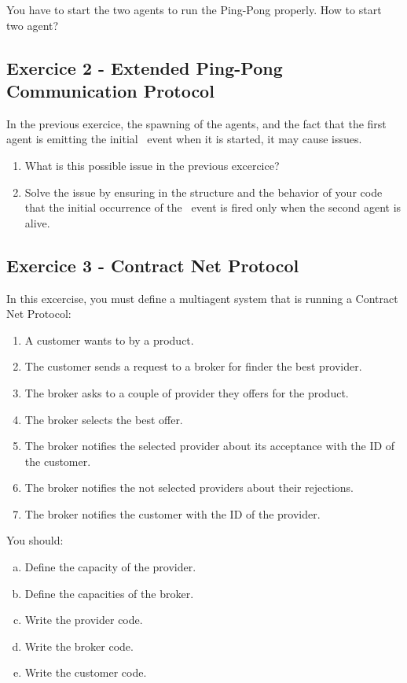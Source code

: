 \documentclass[english,nodocumentinfo,nopubpage]{utbmciadreport}
\begin{document}
You have to start the two agents to run the Ping-Pong properly. How to start two agent?

\subsection{Exercice 2 - Extended Ping-Pong Communication Protocol}

In the previous exercice, the spawning of the agents, and the fact that the first agent is emitting the initial \ event when it is started, it may cause issues.

\begin{enumerate}
\item What is this possible issue in the previous excercice?
\item Solve the issue by ensuring in the structure and the behavior of your code that the initial occurrence of the \ event is fired only when the second agent is alive.
\end{enumerate}

\subsection{Exercice 3 - Contract Net Protocol}

In this excercise, you must define a multiagent system that is running a Contract Net Protocol:
\begin{enumerate}
\item A customer wants to by a product.
\item The customer sends a request to a broker for finder the best provider.
\item The broker asks to a couple of provider they offers for the product.
\item The broker selects the best offer.
\item The broker notifies the selected provider about its acceptance with the ID of the customer.
\item The broker notifies the not selected providers about their rejections.
\item The broker notifies the customer with the ID of the provider.
\end{enumerate}

You should:
\begin{enumerate}[a)]
\item Define the capacity of the provider.
\item Define the capacities of the broker.
\item Write the provider code.
\item Write the broker code.
\item Write the customer code.
\end{enumerate}
\end{document}
